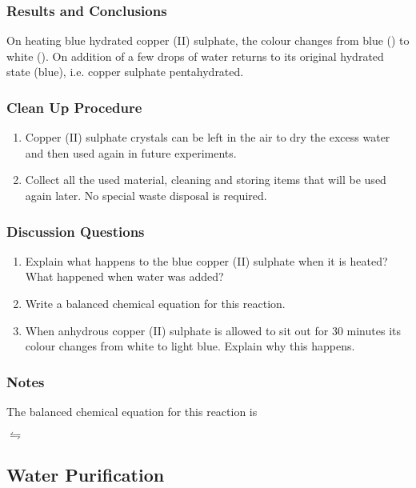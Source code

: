 \subsubsection*{Results and Conclusions}
On heating blue hydrated copper (II) sulphate, the colour changes from blue () to white (). On addition of a few drops of water  returns to its original hydrated state (blue), i.e. copper sulphate pentahydrated.

\subsubsection*{Clean Up Procedure}
\begin{enumerate}
\item{Copper (II) sulphate crystals can be left in the air to dry the excess water and then used again in future experiments.}
\item{Collect all the used material, cleaning and storing items that will be used again later. No special waste disposal is required.}
\end{enumerate}

\subsubsection*{Discussion Questions}
\begin{enumerate}
\item{Explain what happens to the blue copper (II) sulphate when it is heated? What happened when water was added?}
\item{Write a balanced chemical equation for this reaction.}
\item{When anhydrous copper (II) sulphate is allowed to sit out for 30 minutes its colour changes from white to light blue. Explain why this happens.}
\end{enumerate}

\subsubsection*{Notes}
The balanced chemical equation for this reaction is 
\begin{center}
$\leftrightharpoons$ 
\end{center}

\subsection{Water Purification}

